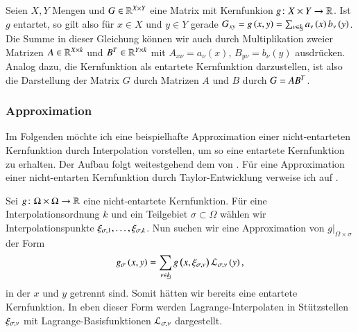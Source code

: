 Seien $X, Y$ Mengen und $G \in \mathbb{R}^{X \times Y}$ eine Matrix mit Kernfunkion $g \colon X \times Y \to \mathbb{R}$. Ist $g$ entartet, so gilt also für $x \in X$ und $y \in Y$ 
gerade $G_{xy} = g\left(x, y\right) = \sum_{\nu \in \haken{k}} a_{\nu}\left(x\right) b_{\nu}\left(y\right)$. Die Summe in dieser Gleichung können wir auch durch Multiplikation zweier Matrizen $A \in \mathbb{R}^{X \times k}$ und 
$B^T \in \mathbb{R}^{Y \times k}$ mit $A_{x\nu} = a_{\nu}\left(x\right)$, $B_{y\nu} = b_{\nu}\left(y\right)$ ausdrücken. Analog dazu, die Kernfunktion als entartete Kernfunktion darzustellen, ist also die Darstellung der Matrix
$G$ durch Matrizen $A$ und $B$ durch $G = AB^T$.
    
    \subsubsection{Approximation}
    \label{sek:approx}
      Im Folgenden möchte ich eine beispielhafte Approximation einer nicht-entarteten Kernfunktion durch Interpolation vorstellen, um so eine entartete Kernfunktion zu erhalten.
      Der Aufbau folgt weitestgehend dem von \citet{nichtlokop}. Für eine Approximation einer nicht-entarten Kernfunktion durch Taylor-Entwicklung verweise ich auf \citet{h2diss}. 
      
      Sei $g \colon \Omega \times \Omega \to \mathbb{R}$ eine nicht-entartete Kernfunktion. Für eine Interpolationsordnung $k$ und ein Teilgebiet $\sigma \subset \Omega$ wählen wir Interpolationspunkte 
      $\xi_{\sigma, 1}, \dots , \xi_{\sigma, k}$. Nun suchen wir eine Approximation von $\left. g\right|_{\Omega \times \sigma}$ der Form
      \begin{equation}
      \label{eq:gsigma}
	g_\sigma\left(x, y\right) = \sum_{\nu \in \haken{k}} g\left(x, \xi_\inds{\nu}\right) \lag_\inds{\nu}\left(y\right),
      \end{equation}
      in der $x$ und $y$ getrennt sind. Somit hätten wir bereits eine entartete Kernfunktion. In eben dieser Form werden Lagrange-Interpolaten in Stützstellen 
      $\xi_{\sigma, \nu}$ mit Lagrange-Basisfunktionen $\mathcal{L}_{\sigma, \nu}$ dargestellt. 
      

